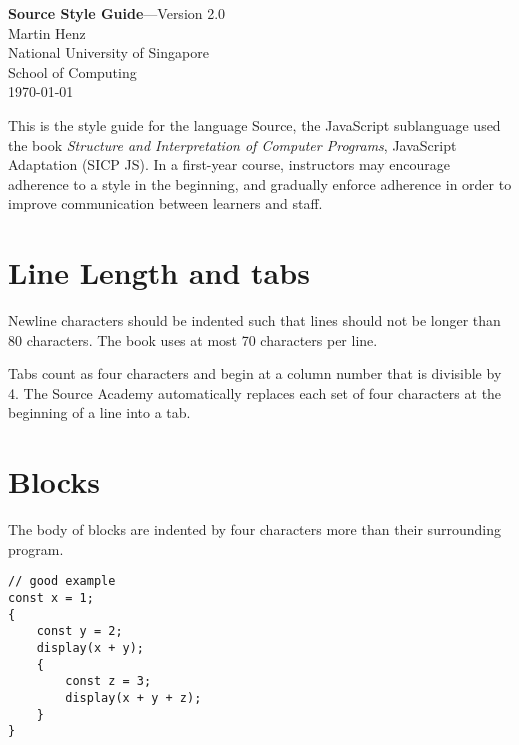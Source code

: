 

\usepackage{CJKutf8}


  \thispagestyle{empty}
  
\begin{center}
  {\Large {\bf Source Style Guide}---Version 2.0}\\[10mm]

  {\large Martin Henz}\\[5mm]

  {\large National University of Singapore \\
          School of Computing}\\[10mm]

  {\large \today}\\[10mm]
\end{center}

This is the style guide for the language Source,
the JavaScript sublanguage used the book \emph{Structure and Interpretation
of Computer Programs}, JavaScript Adaptation (SICP JS). 
In a first-year course, instructors may encourage adherence to a style in the beginning,
and gradually enforce adherence in order to improve communication
between learners and staff.

\section*{Line Length and tabs}
  Newline characters should be indented such that lines
  should not be longer than 80 characters. The book uses at most
  70 characters per line.

Tabs count as four characters and begin at a column number that is divisible by 4.
The Source Academy automatically replaces each set of four characters at the beginning
of a line into a tab.

\section*{Blocks}

The body of blocks are indented by four characters more than their surrounding program.
\begin{lstlisting}
// good example
const x = 1;
{
    const y = 2;
    display(x + y);
    {
        const z = 3;
        display(x + y + z);
    }
}
\end{lstlisting}

